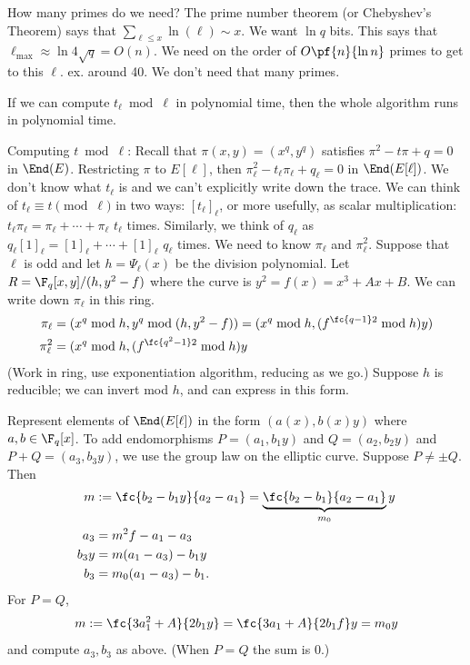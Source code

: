 How many primes do we need? The prime number theorem (or Chebyshev's Theorem) says that $\sum_{\ell\le x}\ln(\ell)\sim x$. We want $\ln q$ bits. This says that $\ell_{\text{max}}\approx \ln 4\sqrt q=O(n)$. We need on the order of $O\pf{n}{\ln n}$ primes to get to this $\ell$. 
ex. around 40. We don't need that many primes.

If we can compute $t_{\ell}\bmod{\ell}$ in polynomial time, then the whole algorithm runs in polynomial time.

Computing $t\bmod{\ell}$: Recall that $\pi(x,y)=(x^q,y^q)$ satisfies $\pi^2-t\pi+q=0$ in $\End(E)$. Restricting $\pi$ to $E[\ell]$, then $\pi_{\ell}^2-t_{\ell}\pi_{\ell}+q_{\ell}=0$ in $\End(E[\ell])$. We don't know what $t_{\ell}$ is and we can't explicitly write down the trace. We can think of $t_{\ell}\equiv t\pmod{\ell}$ in two ways: $[t_{\ell}]_{\ell}$, or more usefully, as scalar multiplication: $t_{\ell}\pi_{\ell}=\pi_{\ell}+\cdots +\pi_{\ell}$ $t_{\ell}$ times. Similarly, we think of $q_{\ell}$ as $q_{\ell}[1]_{\ell}=[1]_{\ell}+\cdots +[1]_{\ell}$ $q_{\ell}$ times. 
We need to know $\pi_{\ell}$ and $\pi_{\ell}^2$. Suppose that $\ell$ is odd and let $h=\Psi_{\ell}(x)$ be the division polynomial. Let $R=\F_q[x,y]/(h,y^2-f)$ where the curve is $y^2=f(x)=x^3+Ax+B$. We can write down $\pi_{\ell}$ in this ring.
\begin{align*}
\pi_{\ell}&=(x^q\bmod h, y^q\bmod{(h,y^2-f)})=
(x^q\bmod h, (f^{\fc{q-1}2}\bmod h)y)\\
\pi_{\ell}^2&=
(x^q\bmod h, (f^{\fc{q^2-1}2}\bmod h)y
\end{align*}
(Work in ring, use exponentiation algorithm, reducing as we go.)
Suppose $h$ is reducible; we can invert mod $h$, and can express in this form.

Represent elements of $\End(E[\ell])$ in the form $(a(x),b(x)y)$ where $a,b\in \F_q[x]$. To add endomorphisms $P=(a_1,b_1y)$ and $Q=(a_2,b_2y)$ and $P+Q=(a_3,b_3y)$, we use the group law on the elliptic curve. Suppose $P\ne \pm Q$. Then
\begin{align*}
m&:=\fc{b_2-b_1y}{a_2-a_1}=\underbrace{\fc{b_2-b_1}{a_2-a_1}}_{m_0}y\\
a_3&=m^2f-a_1-a_3\\
b_3y&= m(a_1-a_3)-b_1y\\
b_3&=m_0(a_1-a_3)-b_1.
\end{align*}
For $P= Q$,
\[
m:= \fc{3a_1^2+A}{2b_1y} = \fc{3a_1+A}{2b_1f} y = m_0y
\]
and compute $a_3,b_3$ as above. (When $P=Q$ the sum is 0.)

